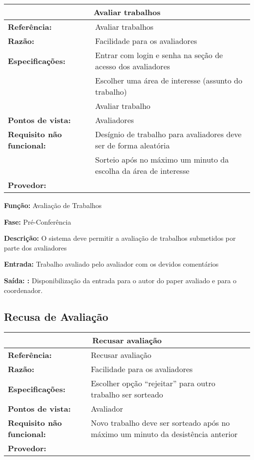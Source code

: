 \documentclass[letter]{article}
\begin{document}
%
\begin{table}[h!]\begin{center}
\begin{tabular}{|ll|}
\hline 
\multicolumn{2}{|c|}{\textbf{Avaliar trabalhos}}\tabularnewline
\hline
\textbf{Referência:} & Avaliar trabalhos\tabularnewline
\textbf{Razão:} & Facilidade para os avaliadores\tabularnewline
\textbf{Especificações:} & Entrar com login e senha na seção de acesso dos avaliadores\tabularnewline
 & Escolher uma área de interesse (assunto do trabalho)\tabularnewline

 & Avaliar trabalho\tabularnewline
\textbf{Pontos de vista:} & Avaliadores\tabularnewline
\textbf{Requisito não funcional:} & Desígnio de trabalho para avaliadores deve ser de forma aleatória\tabularnewline
 & Sorteio após no máximo um minuto da escolha da área de interesse\tabularnewline
\textbf{Provedor:} & \tabularnewline
\hline\end{tabular}\end{center}
\end{table}



\textbf{Função:} Avaliação de Trabalhos

\textbf{Fase: } Pré-Conferência

\textbf{Descrição: } O sistema deve permitir a avaliação de trabalhos submetidos por parte dos avaliadores

\textbf{Entrada: } Trabalho avaliado pelo avaliador com os devidos comentários

\textbf{Saída: :} Disponibilização da entrada para o autor do paper avaliado e para o coordenador.

\newpage
\subsection{ Recusa de Avaliação}

\begin{table}[h!]\begin{center}
\begin{tabular}{|ll|}
\hline 
\multicolumn{2}{|c|}{\textbf{Recusar avaliação}}\tabularnewline
\hline
\textbf{Referência:} & Recusar avaliação\tabularnewline
\textbf{Razão:} & Facilidade para os avaliadores\tabularnewline
\textbf{Especificações:} & Escolher opção \textquotedblleft{}rejeitar\textquotedblright{} para
outro trabalho ser sorteado\tabularnewline
\textbf{Pontos de vista:} & Avaliador\tabularnewline
\textbf{Requisito não funcional:} & Novo trabalho deve ser sorteado após no máximo um minuto da desistência
anterior\tabularnewline
\textbf{Provedor:} & \tabularnewline
\hline\end{tabular}\end{center}
\end{table}
\end{document}
